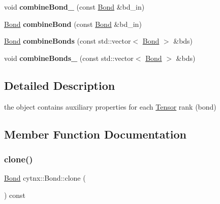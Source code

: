 \begin{DoxyCompactItemize}
\mbox{\label{classcytnx_1_1Bond_ac21ab26ec469ac56ae78c9e4bbbe7040}} 
void {\bfseries combine\+Bond\+\_\+} (const \hyperlink{classcytnx_1_1Bond}{Bond} \&bd\+\_\+in)
\item 
\mbox{\label{classcytnx_1_1Bond_a609c034885efa32fc244be82a56e1f8c}} 
\hyperlink{classcytnx_1_1Bond}{Bond} {\bfseries combine\+Bond} (const \hyperlink{classcytnx_1_1Bond}{Bond} \&bd\+\_\+in)
\item 
\mbox{\label{classcytnx_1_1Bond_a4a1d060cf2d0c44d83356df757a802d1}} 
\hyperlink{classcytnx_1_1Bond}{Bond} {\bfseries combine\+Bonds} (const std\+::vector$<$ \hyperlink{classcytnx_1_1Bond}{Bond} $>$ \&bds)
\item 
\mbox{\label{classcytnx_1_1Bond_a1fd655bfe0845839502b6e385d743078}} 
void {\bfseries combine\+Bonds\+\_\+} (const std\+::vector$<$ \hyperlink{classcytnx_1_1Bond}{Bond} $>$ \&bds)
\end{DoxyCompactItemize}


\subsection{Detailed Description}
the object contains auxiliary properties for each \hyperlink{classcytnx_1_1Tensor}{Tensor} rank (bond) 

\subsection{Member Function Documentation}
\mbox{\label{classcytnx_1_1Bond_a8c4d6443ffe7c3f3ecd8c474fd9a18eb}} 
\subsubsection{\texorpdfstring{clone()}{clone()}}
{\footnotesize\ttfamily \hyperlink{classcytnx_1_1Bond}{Bond} cytnx\+::\+Bond\+::clone (\begin{DoxyParamCaption}{ }\end{DoxyParamCaption}) const\hspace{0.3cm}{\ttfamily [inline]}}



